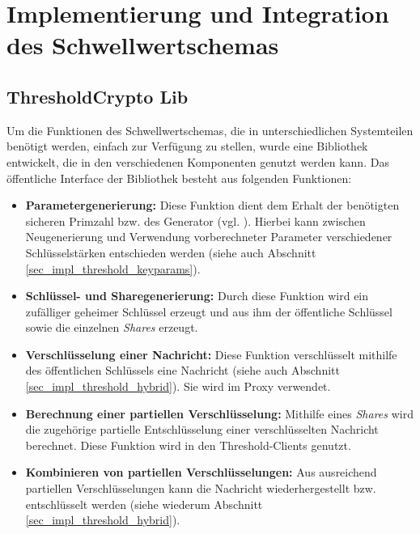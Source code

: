 \section{Implementierung und Integration des Schwellwertschemas}

\label{sec_impl_threshold}


\subsection{ThresholdCrypto \glqq Lib\grqq{}}

%

Um die Funktionen des Schwellwertschemas, die in unterschiedlichen Systemteilen benötigt werden, einfach zur Verfügung zu stellen, wurde eine Bibliothek entwickelt, die in den verschiedenen Komponenten genutzt werden kann. Das öffentliche Interface der Bibliothek besteht aus folgenden Funktionen:

\begin{itemize}
  \item \textbf{Parametergenerierung: } Diese Funktion dient dem Erhalt der benötigten sicheren Primzahl bzw. des Generator (vgl. ). Hierbei kann zwischen Neugenerierung und Verwendung vorberechneter Parameter verschiedener Schlüsselstärken entschieden werden (siehe auch Abschnitt \ref{sec_impl_threshold_keyparams}).
  \item \textbf{Schlüssel- und Sharegenerierung: } Durch diese Funktion wird ein zufälliger geheimer Schlüssel erzeugt und aus ihm der öffentliche Schlüssel sowie die einzelnen \textit{Shares} erzeugt. 
  \item \textbf{Verschlüsselung einer Nachricht: } Diese Funktion verschlüsselt mithilfe des öffentlichen Schlüssels eine Nachricht (siehe auch Abschnitt \ref{sec_impl_threshold_hybrid}). Sie wird im Proxy verwendet.
  \item \textbf{Berechnung einer partiellen Verschlüsselung: } Mithilfe eines \textit{Shares} wird die zugehörige partielle Entschlüsselung einer verschlüsselten Nachricht berechnet. Diese Funktion wird in den Threshold-Clients genutzt.
  \item \textbf{Kombinieren von partiellen Verschlüsselungen: } Aus ausreichend partiellen Verschlüsselungen kann die Nachricht wiederhergestellt bzw. entschlüsselt werden (siehe wiederum Abschnitt \ref{sec_impl_threshold_hybrid}).
\end{itemize}

